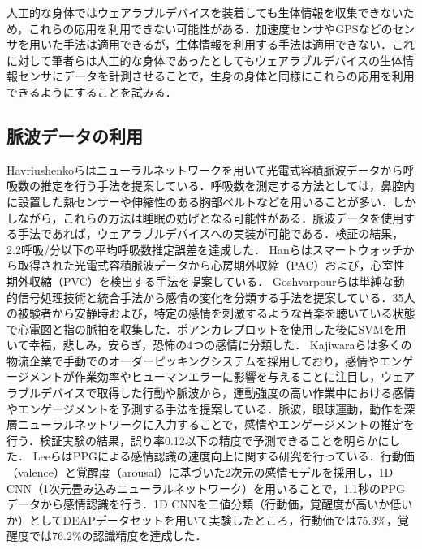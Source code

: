 \documentclass[Japanese,noauthor]{dicomopapers}
\begin{document}
人工的な身体ではウェアラブルデバイスを装着しても生体情報を収集できないため，これらの応用を利用できない可能性がある．加速度センサやGPSなどのセンサを用いた手法は適用できるが，生体情報を利用する手法は適用できない．これに対して筆者らは人工的な身体であったとしてもウェアラブルデバイスの生体情報センサにデータを計測させることで，生身の身体と同様にこれらの応用を利用できるようにすることを試みる．


\subsection{脈波データの利用}
Havriushenkoら\cite{respiratory_rate_estimation}はニューラルネットワークを用いて光電式容積脈波データから呼吸数の推定を行う手法を提案している．呼吸数を測定する方法としては，鼻腔内に設置した熱センサーや伸縮性のある胸部ベルトなどを用いることが多い．しかしながら，これらの方法は睡眠の妨げとなる可能性がある．脈波データを使用する手法であれば，ウェアラブルデバイスへの実装が可能である．検証の結果，2.2呼吸/分以下の平均呼吸数推定誤差を達成した．
Hanら\cite{arrhythmia_detection}はスマートウォッチから取得された光電式容積脈波データから心房期外収縮（PAC）および，心室性期外収縮（PVC）を検出する手法を提案している．
Goshvarpourら\cite{emotion_recognition_poincare}は単純な動的信号処理技術と統合手法から感情の変化を分類する手法を提案している．35人の被験者から安静時および，特定の感情を刺激するような音楽を聴いている状態で心電図と指の脈拍を収集した．ポアンカレプロットを使用した後にSVMを用いて幸福，悲しみ，安らぎ，恐怖の4つの感情に分類した．
Kajiwaraら\cite{pulse_order_picking}は多くの物流企業で手動でのオーダーピッキングシステムを採用しており，感情やエンゲージメントが作業効率やヒューマンエラーに影響を与えることに注目し，ウェアラブルデバイスで取得した行動や脈波から，運動強度の高い作業中における感情やエンゲージメントを予測する手法を提案している．脈波，眼球運動，動作を深層ニューラルネットワークに入力することで，感情やエンゲージメントの推定を行う．検証実験の結果，誤り率0.12以下の精度で予測できることを明らかにした．
Leeら\cite{fast_emotion_recognition}はPPGによる感情認識の速度向上に関する研究を行っている．行動価（valence）と覚醒度（arousal）に基づいた2次元の感情モデルを採用し，1D CNN（1次元畳み込みニューラルネットワーク）を用いることで，1.1秒のPPGデータから感情認識を行う．1D CNNを二値分類（行動価，覚醒度が高いか低いか）としてDEAPデータセットを用いて実験したところ，行動価では75.3\%，覚醒度では76.2\%の認識精度を達成した．\par
\end{document}
